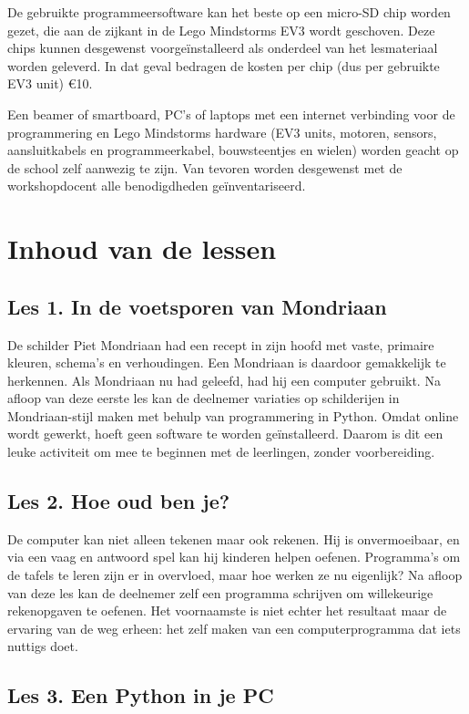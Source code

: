 \documentclass[a4paper,11pt]{article}
\begin{document}
De gebruikte programmeersoftware kan het beste op een micro-SD chip worden gezet, die aan de zijkant in de Lego Mindstorms EV3 wordt geschoven. Deze chips kunnen desgewenst voorgeïnstalleerd als onderdeel van het lesmateriaal worden geleverd. In dat geval bedragen de kosten per chip (dus per gebruikte EV3 unit) \euro{10}.

Een beamer of smartboard, PC's of laptops met een internet verbinding voor de programmering en Lego Mindstorms hardware (EV3 units, motoren, sensors, aansluitkabels en programmeerkabel, bouwsteentjes en wielen) worden geacht op de school zelf aanwezig te zijn. Van tevoren worden desgewenst met de workshopdocent alle benodigdheden geïnventariseerd.

\section*{Inhoud van de lessen}

\subsection*{Les 1. In de voetsporen van Mondriaan}

De schilder Piet Mondriaan had een recept in zijn hoofd met vaste, primaire kleuren, schema's en verhoudingen.
Een Mondriaan is daardoor gemakkelijk te herkennen.
Als Mondriaan nu had geleefd, had hij een computer gebruikt.
Na afloop van deze eerste les kan de deelnemer variaties op schilderijen in Mondriaan-stijl maken met behulp van programmering in Python.
Omdat online wordt gewerkt, hoeft geen software te worden geïnstalleerd.
Daarom is dit een leuke activiteit om mee te beginnen met de leerlingen, zonder voorbereiding.

\subsection*{Les 2. Hoe oud ben je?}

De computer kan niet alleen tekenen maar ook rekenen.
Hij is onvermoeibaar, en via een vaag en antwoord spel kan hij kinderen helpen oefenen.
Programma's om de tafels te leren zijn er in overvloed, maar hoe werken ze nu eigenlijk?
Na afloop van deze les kan de deelnemer zelf een programma schrijven om willekeurige rekenopgaven te oefenen.
Het voornaamste is niet echter het resultaat maar de ervaring van de weg erheen: het zelf maken van een computerprogramma dat iets nuttigs doet.

\subsection*{Les 3. Een Python in je PC}
\end{document}
